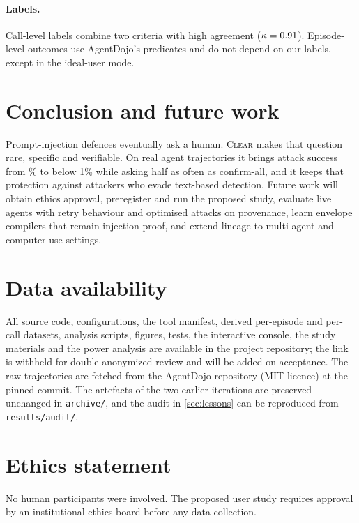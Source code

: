 \documentclass[preprint,12pt,nonatbib]{elsarticle}
\theoremstyle{remark}
\newcommand{\clear}{\textsc{Clear}}
\begin{document}
\paragraph{Labels.} Call-level labels combine two criteria with high agreement
($\kappa=0.91$). Episode-level outcomes use AgentDojo's predicates and do
not depend on our labels, except in the ideal-user mode.

\section{Conclusion and future work}
Prompt-injection defences eventually ask a human. \clear{} makes that question
rare, specific and verifiable. On \nEpisodes{} real agent trajectories it
brings attack success from \asrNone\% to below 1\% while asking half as often as
confirm-all, and it keeps that protection against attackers who evade
text-based detection. Future work will obtain ethics approval, preregister and
run the proposed study, evaluate live agents with retry behaviour and optimised attacks on provenance, learn
envelope compilers that remain injection-proof, and extend lineage to
multi-agent and computer-use settings.

\section*{Data availability}
All source code, configurations, the tool manifest, derived per-episode and
per-call datasets, analysis scripts, figures, tests, the interactive console,
the study materials and the power analysis are available in the project
repository; the link is withheld for double-anonymized review and will be added
on acceptance. The raw trajectories are
fetched from the AgentDojo repository (MIT licence) at the pinned commit. The
artefacts of the two earlier iterations are preserved unchanged in
\texttt{archive/}, and the audit in \cref{sec:lessons} can be reproduced from
\texttt{results/audit/}.

\section*{Ethics statement}
No human participants were involved. The proposed user study requires approval
by an institutional ethics board before any data collection.
\end{document}
